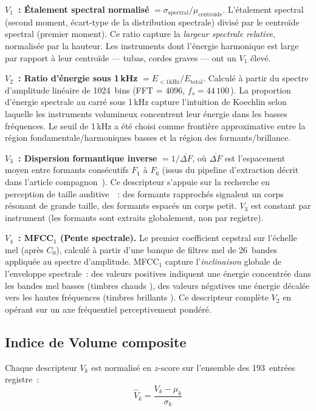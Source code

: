 \documentclass[journal]{IEEEtran}
\newcommand{\Hz}{\,\text{Hz}}
\begin{document}
\textbf{$V_1$~: Étalement spectral normalisé} $= \sigma_\text{spectral} / \mu_\text{centroïde}$. L'étalement spectral (second moment, écart-type de la distribution spectrale) divisé par le centroïde spectral (premier moment). Ce ratio capture la \emph{largeur spectrale relative}, normalisée par la hauteur. Les instruments dont l'énergie harmonique est large par rapport à leur centroïde --- tubas, cordes graves --- ont un $V_1$ élevé.

\textbf{$V_2$~: Ratio d'énergie sous 1\,kHz} $= E_{<1\text{kHz}} / E_\text{total}$. Calculé à partir du spectre d'amplitude linéaire de 1024~bins (FFT = 4096, $f_s = 44\,100$\Hz). La proportion d'énergie spectrale au carré sous 1\,kHz capture l'intuition de Koechlin selon laquelle les instruments volumineux concentrent leur énergie dans les basses fréquences. Le seuil de 1\,kHz a été choisi comme frontière approximative entre la région fondamentale/harmoniques basses et la région des formants/brillance.

\textbf{$V_3$~: Dispersion formantique inverse} $= 1 / \overline{\Delta F}$, où $\overline{\Delta F}$ est l'espacement moyen entre formants consécutifs $F_1$ à $F_6$ (issus du pipeline d'extraction décrit dans l'article compagnon~\cite{Maresz2025}). Ce descripteur s'appuie sur la recherche en perception de taille auditive~\cite{Fitch1997, VanDinther2006}~: des formants rapprochés signalent un corps résonant de grande taille, des formants espacés un corps petit. $V_3$ est constant par instrument (les formants sont extraits globalement, non par registre).

\textbf{$V_4$~: MFCC$_1$ (Pente spectrale).} Le premier coefficient cepstral sur l'échelle mel (après $C_0$), calculé à partir d'une banque de filtres mel de 26~bandes appliquée au spectre d'amplitude. MFCC$_1$ capture l'\emph{inclinaison} globale de l'enveloppe spectrale~: des valeurs positives indiquent une énergie concentrée dans les bandes mel basses (timbres \og chauds \fg), des valeurs négatives une énergie décalée vers les hautes fréquences (timbres \og brillants \fg). Ce descripteur complète $V_2$ en opérant sur un axe fréquentiel perceptivement pondéré.

\subsection{Indice de Volume composite}

Chaque descripteur $V_k$ est normalisé en $z$-score sur l'ensemble des 193~entrées registre~:
\begin{equation}
\hat{V}_k = \frac{V_k - \mu_k}{\sigma_k}
\end{equation}
\end{document}

